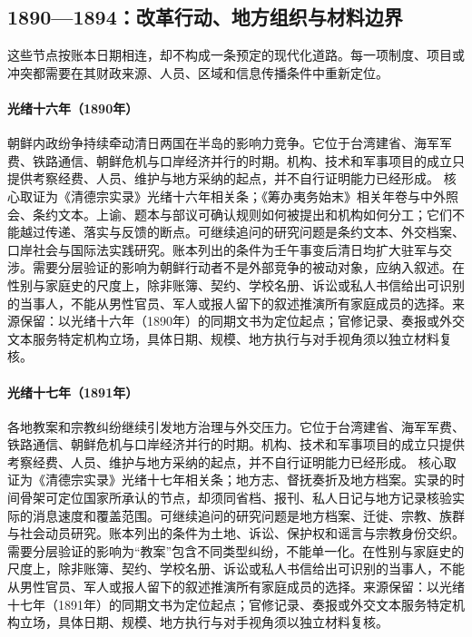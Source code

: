 \subsection{1890—1894：改革行动、地方组织与材料边界}
这些节点按账本日期相连，却不构成一条预定的现代化道路。每一项制度、项目或冲突都需要在其财政来源、人员、区域和信息传播条件中重新定位。
\hypertarget{public:EQ-1890-KOREAN-POLITICAL-CONFLICT}{}\paragraph{光绪十六年（1890年）}朝鲜内政纷争持续牵动清日两国在半岛的影响力竞争。它位于台湾建省、海军军费、铁路通信、朝鲜危机与口岸经济并行的时期。机构、技术和军事项目的成立只提供考察经费、人员、维护与地方采纳的起点，并不自行证明能力已经形成。 核心取证为《清德宗实录》光绪十六年相关条；《筹办夷务始末》相关年卷与中外照会、条约文本。上谕、题本与部议可确认规则如何被提出和机构如何分工；它们不能越过传递、落实与反馈的断点。可继续追问的研究问题是条约文本、外交档案、口岸社会与国际法实践研究。账本列出的条件为壬午事变后清日均扩大驻军与交涉。需要分层验证的影响为朝鲜行动者不是外部竞争的被动对象，应纳入叙述。在性别与家庭史的尺度上，除非账簿、契约、学校名册、诉讼或私人书信给出可识别的当事人，不能从男性官员、军人或报人留下的叙述推演所有家庭成员的选择。来源保留：以光绪十六年（1890年）的同期文书为定位起点；官修记录、奏报或外交文本服务特定机构立场，具体日期、规模、地方执行与对手视角须以独立材料复核。
\hypertarget{public:EQ-1891-MISSIONARY-CONFLICTS}{}\paragraph{光绪十七年（1891年）}各地教案和宗教纠纷继续引发地方治理与外交压力。它位于台湾建省、海军军费、铁路通信、朝鲜危机与口岸经济并行的时期。机构、技术和军事项目的成立只提供考察经费、人员、维护与地方采纳的起点，并不自行证明能力已经形成。 核心取证为《清德宗实录》光绪十七年相关条；地方志、督抚奏折及地方档案。实录的时间骨架可定位国家所承认的节点，却须同省档、报刊、私人日记与地方记录核验实际的消息速度和覆盖范围。可继续追问的研究问题是地方档案、迁徙、宗教、族群与社会动员研究。账本列出的条件为土地、诉讼、保护权和谣言与宗教身份交织。需要分层验证的影响为“教案”包含不同类型纠纷，不能单一化。在性别与家庭史的尺度上，除非账簿、契约、学校名册、诉讼或私人书信给出可识别的当事人，不能从男性官员、军人或报人留下的叙述推演所有家庭成员的选择。来源保留：以光绪十七年（1891年）的同期文书为定位起点；官修记录、奏报或外交文本服务特定机构立场，具体日期、规模、地方执行与对手视角须以独立材料复核。
